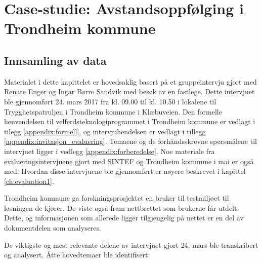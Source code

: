 \chapter{Case-studie: Avstandsoppfølging i Trondheim kommune}
\label{ch:case}

\section{Innsamling av data}
Materialet i dette kapittelet er hovedsaklig basert på et gruppeintervju gjort med Renate Enger og Ingar Børre Sandvik med besøk
av en fastlege. Dette intervjuet ble gjennomført 24. mars 2017 fra kl. 09.00 til kl. 10.50 i lokalene til Trygghetspatruljen i
Trondheim kommune i Klæbuveien. Den formelle henvendelsen til velferdsteknologiprogrammet i Trondheim kommune er vedlagt i
tilegg \ref{appendix:formell}, og intervjuhendelsen er vedlagt i tillegg \ref{appendix:invitasjon_evaluering}. Temaene og
de forhåndsskrevne spørsmålene til intervjuet ligger i vedlegg \ref{appendix:forberedelse}.
Noe materiale fra evalueringsintervjuene gjort med SINTEF og Trondheim kommune i mai er
også med. Hvordan disse intervjuene ble gjennomført er nøyere beskrevet i kapittel \ref{ch:evaluation1}.

Trondheim kommune ga forskningsprosjektet en bruker til testmiljøet til løsningen de kjører. De viste også fram
nettbrettet som brukerne får utdelt. Dette, og informasjonen som allerede ligger tilgjengelig på nettet er en del
av dokumentdelen som analyseres.

De viktigste og mest relevante delene av intervjuet gjort 24. mars ble transkribert og analysert. Åtte hovedtemaer ble identifisert:


